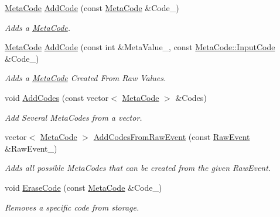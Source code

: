 \begin{DoxyCompactItemize}
\hyperlink{classphys_1_1MetaCode}{MetaCode} \hyperlink{classphys_1_1EventUserInput_aa244b6b8a4b7dc930e25ef8b24af84f4}{AddCode} (const \hyperlink{classphys_1_1MetaCode}{MetaCode} \&Code\_\-)
\begin{DoxyCompactList}\small\item\em Adds a \hyperlink{classphys_1_1MetaCode}{MetaCode}. \item\end{DoxyCompactList}\item 
\hyperlink{classphys_1_1MetaCode}{MetaCode} \hyperlink{classphys_1_1EventUserInput_a9f87a9e6b57f8958945d4955922ebacd}{AddCode} (const int \&MetaValue\_\-, const \hyperlink{classphys_1_1MetaCode_a3e501cbb5bf0f6f1fdb7211465bda8d8}{MetaCode::InputCode} \&Code\_\-)
\begin{DoxyCompactList}\small\item\em Adds a \hyperlink{classphys_1_1MetaCode}{MetaCode} Created From Raw Values. \item\end{DoxyCompactList}\item 
void \hyperlink{classphys_1_1EventUserInput_a1da1fcba3c00346e00c1d4477cc3dbe9}{AddCodes} (const vector$<$ \hyperlink{classphys_1_1MetaCode}{MetaCode} $>$ \&Codes)
\begin{DoxyCompactList}\small\item\em Add Several MetaCodes from a vector. \item\end{DoxyCompactList}\item 
vector$<$ \hyperlink{classphys_1_1MetaCode}{MetaCode} $>$ \hyperlink{classphys_1_1EventUserInput_aa83cb95f719dbdceae282f0dc545aeb0}{AddCodesFromRawEvent} (const \hyperlink{namespacephys_a8126d26e4507e66d09876988bb941fd4}{RawEvent} \&RawEvent\_\-)
\begin{DoxyCompactList}\small\item\em Adds all possible MetaCodes that can be created from the given RawEvent. \item\end{DoxyCompactList}\item 
void \hyperlink{classphys_1_1EventUserInput_a34c05a76a790435799441da75a83fa9c}{EraseCode} (const \hyperlink{classphys_1_1MetaCode}{MetaCode} \&Code\_\-)
\begin{DoxyCompactList}\small\item\em Removes a specific code from storage. \item\end{DoxyCompactList}\item 

\end{DoxyCompactItemize}
